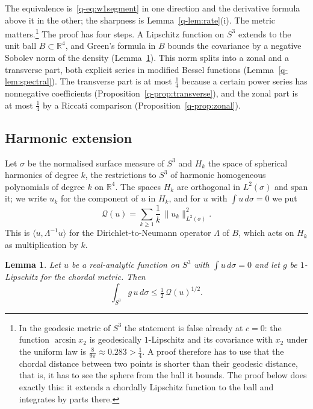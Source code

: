 \documentclass[aps,prd,twocolumn,superscriptaddress,nofootinbib,longbibliography,floatfix,amsmath,amssymb,10pt]{revtex4-2}
\newtheorem{lemma}[theorem]{Lemma}
\theoremstyle{definition}
\theoremstyle{remark}
\newcommand{\R}{\mathbb{R}}
\newcommand{\ip}[2]{\langle #1,#2\rangle}
\begin{document}
The equivalence is~\eqref{q-eq:w1segment} in one direction and the derivative
formula above it in the other; the sharpness is Lemma~\ref{q-lem:rate}(i). The
metric matters.\footnote{In the geodesic metric of $S^3$ the statement is
false already at $c=0$: the function $\arcsin x_2$ is geodesically
$1$-Lipschitz and its covariance with $x_2$ under the uniform law is
$\frac8{9\pi}\approx0.283>\frac14$. A proof therefore has to use that the
chordal distance between two points is shorter than their geodesic distance,
that is, it has to see the sphere from the ball it bounds. The proof below
does exactly this: it extends a chordally Lipschitz function to the ball and
integrates by parts there.} The proof has four steps. A Lipschitz function
on $S^3$ extends to the unit ball $B\subset\R^4$, and Green's formula in $B$
bounds the covariance by a negative Sobolev norm of the density
(Lemma~\ref{q-lem:harmonic}). This norm splits into a zonal and a transverse
part, both explicit series in modified Bessel functions
(Lemma~\ref{q-lem:spectral}). The transverse part is at most $\frac14$ because a
certain power series has nonnegative coefficients
(Proposition~\ref{q-prop:transverse}), and the zonal part is at most $\frac14$
by a Riccati comparison (Proposition~\ref{q-prop:zonal}).

\subsection{Harmonic extension}

Let $\sigma$ be the normalised surface measure of $S^3$ and $H_k$ the space
of spherical harmonics of degree $k$, the restrictions to $S^3$ of harmonic
homogeneous polynomials of degree $k$ on $\R^4$. The spaces $H_k$ are
orthogonal in $L^2(\sigma)$ and span it; we write $u_k$ for the component of
$u$ in $H_k$, and for $u$ with $\int u\,d\sigma=0$ we put
\begin{equation}\label{q-eq:Qnorm}
\mathcal Q(u)=\sum_{k\ge1}\frac1k\,\|u_k\|_{L^2(\sigma)}^2 .
\end{equation}
This is $\ip u{\Lambda^{-1}u}$ for the Dirichlet-to-Neumann operator
$\Lambda$ of $B$, which acts on $H_k$ as multiplication by $k$.

\begin{lemma}\label{q-lem:harmonic}
Let $u$ be a real-analytic function on $S^3$ with $\int u\,d\sigma=0$ and let
$g$ be $1$-Lipschitz for the chordal metric. Then
\[
\int_{S^3}g\,u\,d\sigma\le\tfrac12\,\mathcal Q(u)^{1/2}.
\]
\end{lemma}
\end{document}
